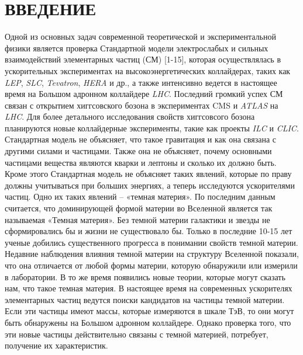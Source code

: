 \chapter*{ВВЕДЕНИЕ}
Одной из основных задач современной теоретической и экспериментальной физики является проверка Стандартной модели электрослабых и сильных взаимодействий элементарных частиц (СМ) [1-15], которая осуществлялась в ускорительных экспериментах на высокоэнергетических коллайдерах, таких как \textit{LEP}, \textit{SLC}, \textit{Tevatron}, \textit{HERA} и др., а также интенсивно ведется в настоящее время на Большом адронном коллайдере \textit{LHC}. Последний громкий успех СМ связан с открытием хиггсовского бозона в экспериментах CMS и \textit{ATLAS} на \textit{LHC}. Для более детального исследования свойств хиггсовсого бозона планируются новые коллайдерные эксперименты, такие как проекты \textit{ILC} и \textit{CLIC}. Стандартная модель не объясняет, что такое гравитация и как она связана с другими силами и частицами. Также она не объясняет, почему основными частицами вещества являются кварки и лептоны и сколько их должно быть. Кроме этого Стандартная модель не объясняет таких явлений, которые по праву должны учитываться при больших энергиях, а теперь исследуются ускорителями частиц. Одно их таких явлений – «темная материя». По последним данным считается, что доминирующей формой материи во Вселенной является так называемая «Темная материя». Без темной материи галактики и звезды не сформировались бы и жизни не существовало бы. Только в последние 10-15 лет ученые добились существенного прогресса в понимании свойств темной материи. Недавние наблюдения влияния темной материи на структуру Вселенной показали, что она отличается от любой формы материи, которую обнаружили или измерили в лаборатории. В то же время появились новые теории, которые могут сказать нам, что такое темная материя. В настоящее время на современных ускорителях элементарных частиц ведутся поиски кандидатов на частицы темной материи. Если эти частицы имеют массы, которые измеряются в шкале ТэВ, то они могут быть обнаружены на Большом адронном коллайдере. Однако проверка того, что эти новые частицы действительно связаны с темной материей, потребует, получение их характеристик.